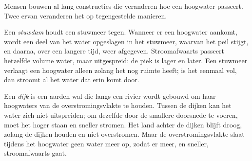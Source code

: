 Mensen bouwen al lang constructies die veranderen hoe een hoogwater passeert.
Twee ervan veranderen het op tegengestelde manieren.

Een \emph{stuwdam} houdt een stuwmeer tegen. Wanneer er een hoogwater aankomt,
wordt een deel van het water opgeslagen in het stuwmeer, waarvan het peil stijgt,
en daarna, over een langere tijd, weer afgegeven. Stroomafwaarts passeert
hetzelfde volume water, maar uitgespreid: de piek is lager en later. Een stuwmeer
verlaagt een hoogwater alleen zolang het nog ruimte heeft; is het eenmaal vol,
dan stroomt al het water dat erin komt door.

Een \emph{dijk} is een aarden wal die langs een rivier wordt gebouwd om haar
hoogwaters van de overstromingsvlakte te houden. Tussen de dijken kan het water
zich niet uitspreiden; om dezelfde  door de smallere doorsnede te
voeren, moet het hoger staan en sneller stromen. Het land achter de dijken blijft
droog, zolang de dijken houden en niet overstromen. Maar de overstromingsvlakte
slaat tijdens het hoogwater geen water meer op, zodat er meer, en sneller,
stroomafwaarts gaat.

